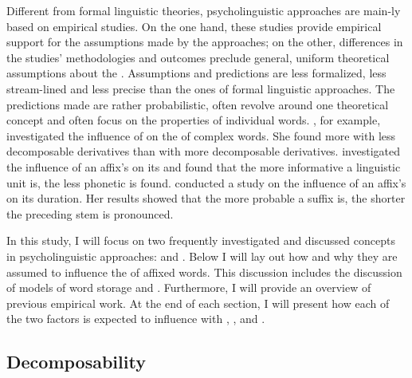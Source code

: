 Different from formal linguistic theories, psycholinguistic approaches are main-ly based on empirical studies. On the one hand, these studies provide empirical support for the assumptions made by the approaches; on the other, differences in the studies' methodologies and outcomes preclude general, uniform theoretical assumptions about the . Assumptions and predictions are less formalized, less stream-lined and less precise than the ones of formal linguistic approaches. The predictions made are rather probabilistic, often revolve around one theoretical concept and often focus on the properties of individual words. 
 \cite{Hay.2001,Hay.2003}, for example, investigated the influence of  on the  of complex words.  She found more  with less decomposable derivatives than with more decomposable derivatives. 
\cite{Pluymaekers.2010} investigated the influence of an affix's  on its  and found that the more informative a linguistic unit is, the less phonetic  is found. 
\cite{Cohen.2014} conducted a study on the influence of an affix's  on its duration. Her results showed that the more probable a suffix is, the shorter the preceding stem is pronounced.

In this study, I will focus on two frequently investigated and discussed concepts in psycholinguistic approaches:  and . Below I will lay out how and why they are assumed to influence the  of affixed words. This discussion includes the discussion of models of word storage and . Furthermore, I will provide an overview of previous empirical work.
 At the end of each section, I will present how each of the two factors is expected to influence  with , ,  and .

\subsection{Decomposability} \label{decomposability}

